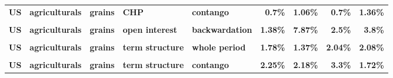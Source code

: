 \documentclass[
  authoryear,
  preprint,
  3p]{elsarticle}
\begin{document}
\begin{landscape}
\begin{longtable}[t]{>{}l>{}l>{}l>{}l>{}l>{}r>{}r>{}r>{}r}
\textbf{US} & \textbf{agriculturals} & \textbf{grains} & \textbf{CHP} & \textbf{contango} & \textcolor[HTML]{4285f4}{\textbf{0.7\%}} & \textcolor[HTML]{4285f4}{\textbf{1.06\%}} & \textcolor[HTML]{4285f4}{\textbf{0.7\%}} & \textcolor[HTML]{4285f4}{\textbf{1.36\%}}\\
\textbf{\cellcolor{gray!10}{US}} & \textbf{\cellcolor{gray!10}{agriculturals}} & \textbf{\cellcolor{gray!10}{grains}} & \textbf{\cellcolor{gray!10}{open interest}} & \textbf{\cellcolor{gray!10}{whole period}} & \textcolor[HTML]{4285f4}{\textbf{\cellcolor{gray!10}{2.22\%}}} & \textcolor[HTML]{4285f4}{\textbf{\cellcolor{gray!10}{4.18\%}}} & \textcolor[HTML]{4285f4}{\textbf{\cellcolor{gray!10}{0.67\%}}} & \textcolor[HTML]{4285f4}{\textbf{\cellcolor{gray!10}{2.04\%}}}\\
\textbf{US} & \textbf{agriculturals} & \textbf{grains} & \textbf{open interest} & \textbf{backwardation} & \textcolor[HTML]{4285f4}{\textbf{1.38\%}} & \textcolor[HTML]{4285f4}{\textbf{7.87\%}} & \textcolor[HTML]{4285f4}{\textbf{2.5\%}} & \textcolor[HTML]{4285f4}{\textbf{3.8\%}}\\
\textbf{\cellcolor{gray!10}{US}} & \textbf{\cellcolor{gray!10}{agriculturals}} & \textbf{\cellcolor{gray!10}{grains}} & \textbf{\cellcolor{gray!10}{open interest}} & \textbf{\cellcolor{gray!10}{contango}} & \textcolor[HTML]{4285f4}{\textbf{\cellcolor{gray!10}{3.3\%}}} & \textcolor[HTML]{4285f4}{\textbf{\cellcolor{gray!10}{1.92\%}}} & \textcolor[HTML]{4285f4}{\textbf{\cellcolor{gray!10}{0.69\%}}} & \textcolor[HTML]{4285f4}{\textbf{\cellcolor{gray!10}{1.24\%}}}\\
\addlinespace
\textbf{US} & \textbf{agriculturals} & \textbf{grains} & \textbf{term structure} & \textbf{whole period} & \textcolor[HTML]{4285f4}{\textbf{1.78\%}} & \textcolor[HTML]{4285f4}{\textbf{1.37\%}} & \textcolor[HTML]{4285f4}{\textbf{2.04\%}} & \textcolor[HTML]{4285f4}{\textbf{2.08\%}}\\
\textbf{\cellcolor{gray!10}{US}} & \textbf{\cellcolor{gray!10}{agriculturals}} & \textbf{\cellcolor{gray!10}{grains}} & \textbf{\cellcolor{gray!10}{term structure}} & \textbf{\cellcolor{gray!10}{backwardation}} & \textcolor[HTML]{4285f4}{\textbf{\cellcolor{gray!10}{1.47\%}}} & \textcolor[HTML]{4285f4}{\textbf{\cellcolor{gray!10}{1.19\%}}} & \textcolor[HTML]{4285f4}{\textbf{\cellcolor{gray!10}{1.87\%}}} & \textcolor[HTML]{4285f4}{\textbf{\cellcolor{gray!10}{3.56\%}}}\\
\textbf{US} & \textbf{agriculturals} & \textbf{grains} & \textbf{term structure} & \textbf{contango} & \textcolor[HTML]{4285f4}{\textbf{2.25\%}} & \textcolor[HTML]{4285f4}{\textbf{2.18\%}} & \textcolor[HTML]{4285f4}{\textbf{3.3\%}} & \textcolor[HTML]{4285f4}{\textbf{1.72\%}}\\

\end{longtable}
\end{landscape}
\end{document}
